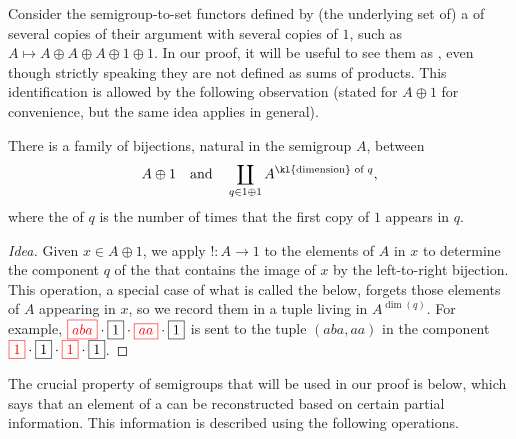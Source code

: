 Consider the semigroup-to-set functors defined by (the underlying set of) a
 of several copies of their argument with several copies of $1$,
such as $A \mapsto A \oplus A \oplus A \oplus 1 \oplus 1$. In our proof, it will
be useful to see them as , even though strictly speaking
they are not defined as sums of products. This identification is allowed by the
following observation (stated for $A\oplus1$ for convenience, but the same idea
applies in general).
\begin{proposition}
  There is a family of bijections, natural in the semigroup $A$, between
  \begin{align*}
    A \oplus 1 \quad \text{and} \quad \coprod_{q \in 1 \oplus 1} A^{\text{\kl{dimension} of $q$}},
  \end{align*}
  where the  of $q$ is the number of times that the
  first copy of $1$ appears in $q$.
\end{proposition}
\begin{proof}[Idea]
  Given $x\in A\oplus1$, we apply $!\colon A\to1$ to the elements of $A$ in $x$
  to determine the component $q$ of the  that contains
  the image of $x$ by the left-to-right bijection. This operation, a special
  case of what is called the  below, forgets those elements of $A$
  appearing in $x$, so we record them in a tuple living in $A^{\dim(q)}$. For
  example, ${\color{red}\boxed{aba}} \cdot {\boxed{1}} \cdot {\color{red}\boxed{aa}} \cdot
  \boxed{1}$ is sent to the tuple $(aba,aa)$ in the component ${\color{red}\boxed{1}}
  \cdot {\boxed{1}} \cdot {\color{red}\boxed{1}} \cdot \boxed{1}$.
\end{proof}

The crucial property of semigroups that will be used in our proof is  below, which says that an element of a  can be reconstructed based on certain partial information. This information is described  using the following operations.

